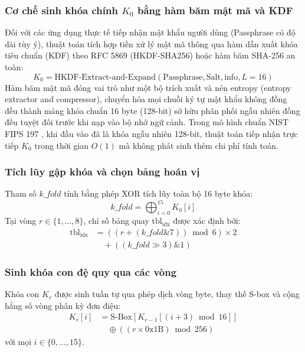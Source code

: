 \documentclass[10pt,twocolumn]{article}
\begin{document}
\subsubsection{Cơ chế sinh khóa chính $K_0$ bằng hàm băm mật mã và KDF}
Đối với các ứng dụng thực tế tiếp nhận mật khẩu người dùng (Passphrase có độ dài tùy ý), thuật toán tích hợp tiền xử lý mật mã thông qua hàm dẫn xuất khóa tiêu chuẩn (KDF) theo RFC 5869 (HKDF-SHA256) hoặc hàm băm SHA-256 an toàn:
\begin{equation}
    K_0 = \text{HKDF-Extract-and-Expand}(\text{Passphrase}, \text{Salt}, \text{info}, L=16)
\end{equation}
Hàm băm mật mã đóng vai trò như một bộ trích xuất và nén entropy (entropy extractor and compressor), chuyển hóa mọi chuỗi ký tự mật khẩu không đồng đều thành mảng khóa chuẩn 16 byte (128-bit) sở hữu phân phối ngẫu nhiên đồng đều tuyệt đối trước khi nạp vào bộ nhớ ngữ cảnh. Trong mô hình chuẩn NIST FIPS 197 \cite{nist2001fips}, khi đầu vào đã là khóa ngẫu nhiên 128-bit, thuật toán tiếp nhận trực tiếp $K_0$ trong thời gian $O(1)$ mà không phát sinh thêm chi phí tính toán.

\subsubsection{Tích lũy gập khóa và chọn bảng hoán vị}
Tham số $\mathit{k\_fold}$ tính bằng phép XOR tích lũy toàn bộ 16 byte khóa:
\begin{equation}
    \mathit{k\_fold} = \bigoplus_{i=0}^{15} K_0[i]
\end{equation}
Tại vòng $r \in \{1, \dots, 8\}$, chỉ số bảng quay $\text{tbl}_{\text{idx}}$ được xác định bởi:
\begin{equation}
\begin{aligned}
    \text{tbl}_{\text{idx}} &= \left( (r + (\mathit{k\_fold} \mathbin{\&} 7)) \bmod 6 \right) \times 2 \\
    &\quad + ((\mathit{k\_fold} \gg 3) \mathbin{\&} 1)
\end{aligned}
\end{equation}

\subsubsection{Sinh khóa con đệ quy qua các vòng}
Khóa con $K_r$ được sinh tuần tự qua phép dịch vòng byte, thay thế S-box và cộng hằng số vòng phân kỳ đơn điệu:
\begin{equation}
\begin{aligned}
    K_r[i] &= \text{S-Box}\left[ K_{r-1}[(i + 3) \bmod 16] \right] \\
    &\quad \oplus \left( (r \times \text{0x1B}) \bmod 256 \right)
\end{aligned}
\end{equation}
với mọi $i \in \{0, \dots, 15\}$.
\end{document}
